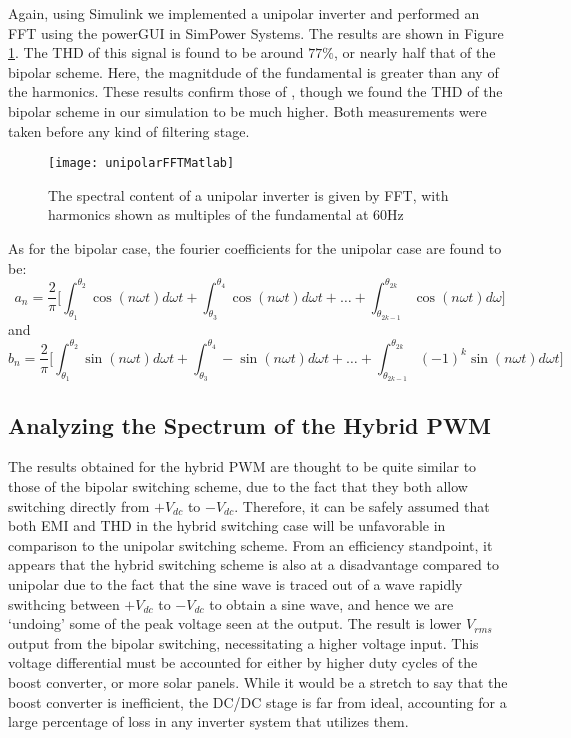 Again, using Simulink we implemented a unipolar inverter and performed an FFT using the powerGUI in SimPower Systems. The results are shown in Figure \ref{unipolarFFTMatlab}. The THD of this signal is found to be around $77\%$, or nearly half that of the bipolar scheme. Here, the magnitdude of the fundamental is greater than any of the harmonics. These results confirm those of \cite{fourierAnalysis}, though we found the THD of the bipolar scheme in our simulation to be much higher. Both measurements were taken before any kind of filtering stage. 

\begin{figure}
\centering
\texttt{[image: unipolarFFTMatlab]}
\caption{The spectral content of a unipolar inverter is given by FFT, with harmonics shown as multiples of the fundamental at 60Hz}
\label{unipolarFFTMatlab}
\end{figure}

As for the bipolar case, the fourier coefficients for the unipolar case are found to be:
\begin{equation}
a_n = \frac{2}{\pi} \Big[\int_{\theta_1}^{\theta_2} \cos(n\omega t) d\omega t + \int_{\theta_3}^{\theta_4} \cos(n\omega t)d\omega t +\ldots +
\int_{\theta_{2k-1}}^{\theta_{2k}} \cos(n\omega t)d\omega \Big]
\end{equation} 
and 
\begin{equation}
b_n = \frac{2}{\pi} \Big[\int_{\theta_1}^{\theta_2} \sin(n\omega t) d\omega t + \int_{\theta_3}^{\theta_4} -\sin(n\omega t)d\omega t +\ldots +
\int_{\theta_{2k-1}}^{\theta_{2k}} (-1)^k \sin(n\omega t)d\omega t \Big]
\end{equation} 

\subsection{Analyzing the Spectrum of the Hybrid PWM}
The results obtained for the hybrid PWM are thought to be quite similar to those of the bipolar switching scheme, due to the fact that they both allow switching directly from $+V_{dc}$ to $-V_{dc}$. Therefore, it can be safely assumed that both EMI and THD in the hybrid switching case will be unfavorable in comparison to the unipolar switching scheme. From an efficiency standpoint, it appears that the hybrid switching scheme is also at a disadvantage compared to unipolar due to the fact that the sine wave is traced out of a wave rapidly swithcing between $+V_{dc}$ to $-V_{dc}$ to obtain a sine wave, and hence we are `undoing' some of the peak voltage seen at the output. The result is lower $V_{rms}$ output from the bipolar switching, necessitating a higher voltage input. This voltage differential must be accounted for either by higher duty cycles of the boost converter, or more solar panels. While it would be a stretch to say that the boost converter is inefficient, the DC/DC stage is far from ideal, accounting for a large percentage of loss in any inverter system that utilizes them. 

